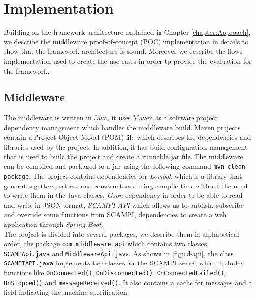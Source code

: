 
\chapter{Implementation}\label{chapter:implementation}
Building on the framework architecture explained in Chapter \ref{chapter:Approach}, we describe the middleware proof-of-concept (POC) implementation in details to show that the framework architecture is sound. Moreover we describe the flows implementation used to create the use cases in order tp provide the evaluation for the framework. \\

\section{Middleware}

 The middleware is written in Java, it uses Maven as a  software project dependency management which handles the middleware build. Maven projects contain a Project Object Model (POM) file which describes the dependencies and libraries used by the project. In addition, it has build configuration management that is used to build the project and create a runnable jar file. The middleware can be compiled and packaged to a jar using the following command \verb|mvn clean package|. The project contains dependencies for \textit{Lombok} which is a library that generates getters, setters and constructors during compile time without the need to write them in the Java classes, \textit{Gson} dependency in order to be able to read and write in JSON format, \textit{SCAMPI API} which allows us to publish, subscribe and override some functions from SCAMPI, dependencies to create a web application through \textit{Spring Boot}. \\
 
 \noindent The project is divided into several packages, we describe them in alphabetical order, the package \verb|com.middleware.api| which contains two classes, \verb|SCAMPApi.java|  and \verb|MiddlewareApi.java|. As shown in \ref{fig:cd-api}, the class \verb|SCAMPIAPI.java| implements two classes for the SCAMPI server which includes functions like \verb|OnConnected()|, \verb|OnDisconnected()|, \verb|OnConnectedFailed()|, \verb|OnStopped()| and \verb|messageReceived()|. It also contains a cache for messages and a field indicating the machine specification
  
